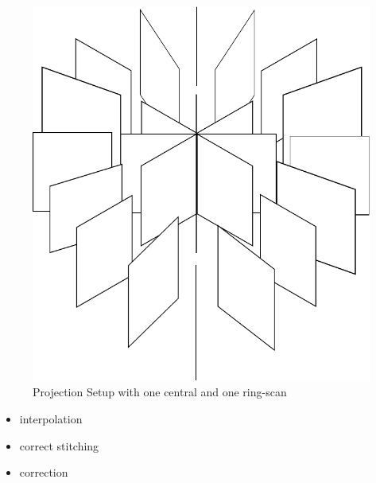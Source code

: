 \begin{figure}[tb]
	\centering
		\includegraphics[width=\imsize]{img/projections}
	\caption{Projection Setup with one central and one ring-scan}
	\label{fig:projections}
\end{figure}


\begin{itemize}
	\item interpolation
	\item correct stitching
	\item correction
\end{itemize}